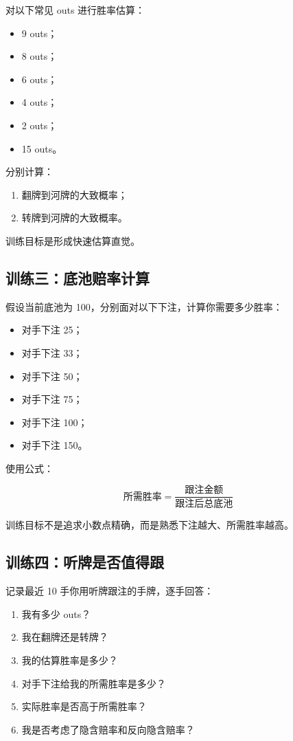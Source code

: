 对以下常见 outs 进行胜率估算：

\begin{itemize}
\item 9 outs；
\item 8 outs；
\item 6 outs；
\item 4 outs；
\item 2 outs；
\item 15 outs。
\end{itemize}

分别计算：

\begin{enumerate}
\item 翻牌到河牌的大致概率；
\item 转牌到河牌的大致概率。
\end{enumerate}

训练目标是形成快速估算直觉。

\subsection*{训练三：底池赔率计算}

假设当前底池为 100，分别面对以下下注，计算你需要多少胜率：

\begin{itemize}
\item 对手下注 25；
\item 对手下注 33；
\item 对手下注 50；
\item 对手下注 75；
\item 对手下注 100；
\item 对手下注 150。
\end{itemize}

使用公式：

\[
\text{所需胜率} =
\frac{\text{跟注金额}}{\text{跟注后总底池}}
\]

训练目标不是追求小数点精确，而是熟悉下注越大、所需胜率越高。

\subsection*{训练四：听牌是否值得跟}

记录最近 10 手你用听牌跟注的手牌，逐手回答：

\begin{enumerate}
\item 我有多少 outs？
\item 我在翻牌还是转牌？
\item 我的估算胜率是多少？
\item 对手下注给我的所需胜率是多少？
\item 实际胜率是否高于所需胜率？
\item 我是否考虑了隐含赔率和反向隐含赔率？
\end{enumerate}

